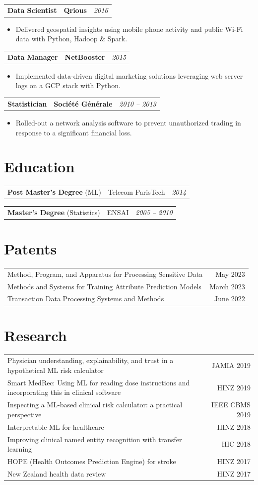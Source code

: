 \documentclass[letterpaper,11pt]{article}
\newcommand{\resumeItem}[1]{
  \item\small{#1 \vspace{-6pt}}
}
\newcommand{\resumeItemListStart}{\begin{itemize}[label=$\circ$, topsep=0.2cm, leftmargin=0.6cm]}
\newcommand{\resumeItemListEnd}{\end{itemize}\vspace{8pt}}
\newcommand{\job}[4]{
    \begin{tabular}{p{7cm}p{6cm}p{5cm}}
      \hspace{-0.7em} \textbf{#1} & \textbf{\small{#2}} & \hfill \textit{\small{#4}}
    \end{tabular}
}
\newcommand{\degree}[4]{
    \begin{tabular}{p{7cm}p{6cm}p{5cm}}
      \hspace{-0.7em} \textbf{\small{#1}} (\small{#2}) & \small{#3} & \hfill \textit{\small{#4}}
    \end{tabular}
}
\begin{document}
    \job {Data Scientist}{Qrious}{Auckland}{2016}
      \resumeItemListStart
        \resumeItem {Delivered geospatial insights using mobile phone activity and public Wi-Fi data with Python, Hadoop \& Spark.}
      \resumeItemListEnd

    \job {Data Manager}{NetBooster}{Paris}{2015}
        \resumeItemListStart
          \resumeItem {Implemented data-driven digital marketing solutions leveraging web server logs on a GCP stack with Python.}
        \resumeItemListEnd

    \job {Statistician}{Société Générale}{Paris}{2010 -- 2013}
      \resumeItemListStart
        \resumeItem {Rolled-out a network analysis software to prevent unauthorized trading in response to a significant financial loss.}
      \resumeItemListEnd
    
\section{Education}
  \degree {Post Master’s Degree}{ML}{Telecom ParisTech}{2014}
  \degree {Master's Degree}{Statistics}{ENSAI}{2005 -- 2010}

\section{Patents}
\begin{tabular*}{\textwidth}{l@{\extracolsep{\fill}}r}
{\small Method, Program, and Apparatus for Processing Sensitive Data} & {\small May 2023}\\
{\small Methods and Systems for Training Attribute Prediction Models} & {\small March 2023}\\
{\small Transaction Data Processing Systems and Methods} & {\small June 2022}\\
\end{tabular*}

\section{Research} 
\begin{tabular*}{\textwidth}{l@{\extracolsep{\fill}}r}
{\small Physician understanding, explainability, and trust in a hypothetical ML risk calculator} & {\small JAMIA 2019}\\
{\small Smart MedRec: Using ML for reading dose instructions and incorporating this in clinical software} & {\small HINZ 2019}\\
{\small Inspecting a ML-based clinical risk calculator: a practical perspective} & {\small IEEE CBMS 2019}\\
{\small Interpretable ML for healthcare} & {\small HINZ 2018}\\
{\small Improving clinical named entity recognition with transfer learning} & {\small HIC 2018}\\
{\small HOPE (Health Outcomes Prediction Engine) for stroke} & {\small HINZ 2017}\\
{\small New Zealand health data review} & {\small HINZ 2017}\\
\end{tabular*}
\end{document}
